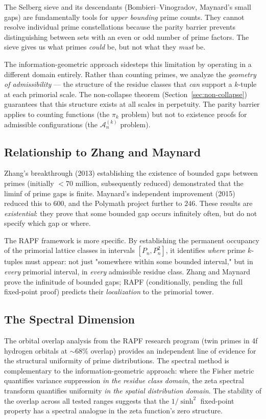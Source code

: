 \documentclass[11pt]{article}
\theoremstyle{remark}
\begin{document}
The Selberg sieve and its descendants (Bombieri--Vinogradov, Maynard's
small gaps) are fundamentally tools for \emph{upper bounding} prime
counts. They cannot resolve individual prime constellations because the
parity barrier prevents distinguishing between sets with an even or
odd number of prime factors. The sieve gives us what primes \emph{could}
be, but not what they \emph{must} be.

The information-geometric approach sidesteps this limitation by operating
in a different domain entirely. Rather than counting primes, we analyze
the \emph{geometry of admissibility} --- the structure of the residue
classes that \emph{can} support a $k$-tuple at each primorial scale.
The non-collapse theorem (Section~\ref{sec:non-collapse}) guarantees
that this structure exists at all scales in perpetuity. The parity
barrier applies to counting functions (the $\pi_k$ problem) but not to
existence proofs for admissible configurations (the $\mathcal{A}_n^{(k)}$
problem).

\subsection{Relationship to Zhang and Maynard}

Zhang's breakthrough (2013) establishing the existence of bounded gaps
between primes (initially $< 70$ million, subsequently reduced)
demonstrated that the liminf of prime gaps is finite. Maynard's
independent improvement (2015) reduced this to $600$, and the
Polymath project further to $246$. These results are \emph{existential}:
they prove that some bounded gap occurs infinitely often, but do not
specify which gap or where.

The RAPF framework is more specific. By establishing the permanent
occupancy of the primorial lattice classes in intervals $[P_n, P_n^2]$,
it identifies \emph{where} prime $k$-tuples must appear: not just
"somewhere within some bounded interval," but in \emph{every} primorial
interval, in \emph{every} admissible residue class. Zhang and Maynard
prove the infinitude of bounded gaps; RAPF (conditionally, pending the
full fixed-point proof) predicts their \emph{localization} to the
primorial tower.

\subsection{The Spectral Dimension}

The orbital overlap analysis from the RAPF research program (twin primes
in 4f hydrogen orbitals at $\sim 68\%$ overlap) provides an independent
line of evidence for the structural uniformity of prime distributions.
The spectral method is complementary to the information-geometric
approach: where the Fisher metric quantifies variance suppression
\emph{in the residue class domain}, the zeta spectral transform
quantifies uniformity \emph{in the spatial distribution domain}. The
stability of the overlap across all tested ranges suggests that the
$1/\sinh^2$ fixed-point property has a spectral analogue in the
zeta function's zero structure.
\end{document}
